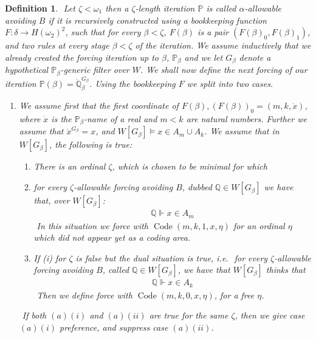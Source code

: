 \documentclass[a4paper,11pt]{article}
\newtheorem{definition}[theorem]{Definition}
\newcommand{\forceP}{\mathbb{P}}
\newcommand{\forceQ}{\mathbb{Q}}
\begin{document}
 \begin{definition}\label{AlphaAllowableAvoidingB}
    ﻿
    Let  $\zeta< \omega_1$ then a $\zeta$-length iteration $\forceP$ is called $\alpha$-allowable avoiding $B$ if it is recursively constructed using a bookkeeping function $F: \delta \rightarrow H(\omega_2)^2$, such that for every $\beta < \zeta$, $F(\beta)$ is a pair $(F(\beta)_0, F(\beta)_1)$, and two rules at every stage $\beta < \zeta$ of the iteration. We assume inductively that we already created the forcing iteration up to $\beta$, $\forceP_{\beta}$ and we let $G_{\beta}$ denote a hypothetical $\forceP_{\beta}$-generic filter over $W$. We shall now define the next forcing of our iteration $\forceP(\beta)=\dot{\forceQ}_{\beta}^{G_{\beta}}$. Using the bookkeeping $F$ we split into two cases.
    ﻿
    \begin{enumerate}
    ﻿
    \item[(a)] We assume first that the first coordinate of $F(\beta) ,(F(\beta))_0=(m,k,\dot{x})$, where $\dot{x}$ is the $\forceP_{\beta}$-name of a real and $m<k$ are natural numbers. Further we assume that $\dot{x}^{G_{\beta}}=x$, and $W[G_{\beta}] \models x \in A_m \cup A_k$. 
    ﻿
    We assume that in $W[G_{\beta}]$, the following is true:
    ﻿
    \begin{enumerate}
    ﻿
    \item[] There is an ordinal $\zeta $, which is chosen to be minimal for which
    ﻿
    \item[(i)] for every $\zeta$-allowable forcing avoiding $B$, dubbed $\forceQ \in W[G_{\beta}]$  we have that, over $W[G_{\beta}]$:
    ﻿
    \begin{align*}
    \forceQ \Vdash  x \in A_m
    \end{align*}
    ﻿
    In this situation we force with $\operatorname{Code} (m,k,1,x,\eta)$ for an ordinal $\eta$ which did not appear yet as a coding area.
    ﻿
    ﻿
    \item[(ii)] If (i) for $\zeta$ is false but the dual situation is true, i.e.
    ﻿
    for every $\zeta$-allowable forcing avoiding $B$, called $\forceQ \in W[G_{\beta}]$, we have that $W[G_{\beta}] $ thinks that
    ﻿
    \begin{align*}
      \forceQ \Vdash   x \in A_k
    \end{align*}
    ﻿
    Then we define force with $\operatorname{Code} (m,k,0,x,\eta)$, for a free $\eta$.
    ﻿
    \end{enumerate}
    ﻿
    If both $(a) (i)$ and $(a) (ii)$ are true for the same $\zeta$, then we give case $(a) (i)$ preference, and suppress case $(a) (ii)$.

\end{enumerate}
\end{definition}
\end{document}
